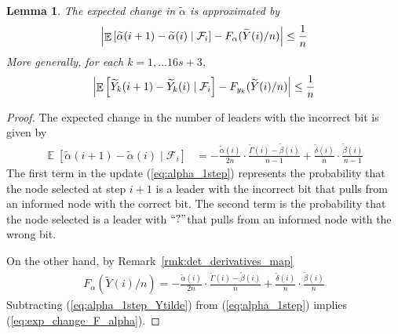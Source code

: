 \documentclass[a4paper,12pt]{article}
\newcommand{\q}{$``?"$}
\newtheorem{lemma}{Lemma}
\DeclareMathOperator{\Ex}{\mathbb{E}}%
\begin{document}
\begin{lemma} \label{lem:change_expectation_Y}
The expected change in $\widetilde{\alpha}$ is approximated by
\begin{align} \label{eq:exp_change_F_alpha}
\Bigl|\Ex \left[\widetilde{\alpha}(i+1) - \widetilde{\alpha}(i) \mid \mathcal{F}_i \right]  - F_{\alpha}({\widetilde{Y}(i)}/{n}) \Bigr| \leq \frac{1}{n}
\end{align}
More generally, for each $k = 1, \ldots 16s+3$,
\begin{align} \label{eq:expected_change_Y_tilde}
\Bigl| \Ex \left[\widetilde{Y}_k(i+1) - \widetilde{Y}_k(i) \mid \mathcal{F}_i \right]  - F_{{y}_k}({\widetilde{Y}(i)}/{n}) \Bigr| \leq \frac{1}{n}
\end{align}
\end{lemma}
\begin{proof}
The expected change in the number of leaders with the incorrect bit is given by
\begin{align} \label{eq:alpha_1step}
\Ex\left[\widetilde{\alpha}(i+1) - \widetilde{\alpha}(i) \mid \mathcal{F}_i \right] & = - \frac{\widetilde{\alpha}(i)}{2n} \cdot \frac{\widetilde{\Gamma}(i)-\widetilde{\beta}(i)}{n-1} + \frac{\widetilde{\delta}(i)}{n} \cdot \frac{\widetilde{\beta}(i)}{n-1}
\end{align}
The first term in the update (\ref{eq:alpha_1step}) represents the probability that the node selected at step $i+1$ is a leader with the incorrect bit that pulls from an informed node with the correct bit. The second term is the probability that the node selected is a leader with \q that pulls from an informed node with the wrong bit.

\medskip

On the other hand, by Remark~\ref{rmk:det_derivatives_map}
\begin{align} \label{eq:alpha_1step_Ytilde}
F_{\alpha}(\widetilde{Y}(i)/n) = - \frac{\widetilde{\alpha}(i)}{2n} \cdot \frac{\widetilde{\Gamma}(i) - \widetilde{\beta}(i)}{n} + \frac{\widetilde{\delta}(i)}{n} \cdot \frac{\widetilde{\beta}(i)}{n}
\end{align}
Subtracting (\ref{eq:alpha_1step_Ytilde}) from (\ref{eq:alpha_1step}) implies (\ref{eq:exp_change_F_alpha}).



\end{proof}
\end{document}
